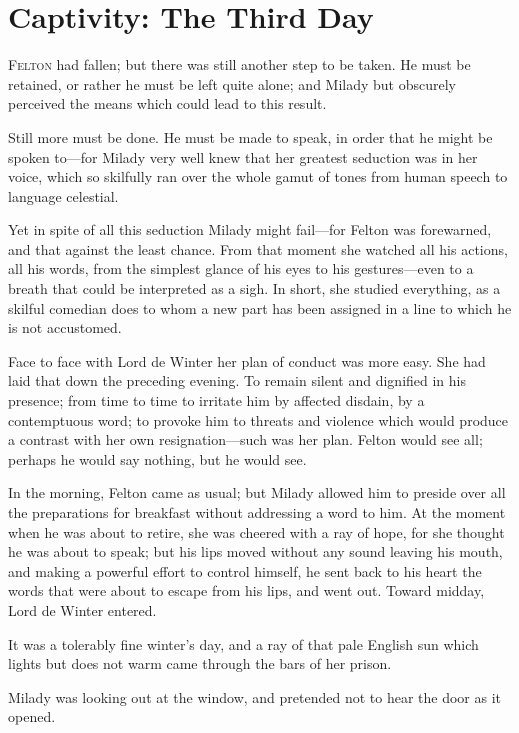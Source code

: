 
\chapter{Captivity: The Third Day}

\lettrine[]{F}{elton} had fallen; but there was still another step to be taken. He must be retained, or rather he must be left quite alone; and Milady but obscurely perceived the means which could lead to this result. 

Still more must be done. He must be made to speak, in order that he might be spoken to---for Milady very well knew that her greatest seduction was in her voice, which so skilfully ran over the whole gamut of tones from human speech to language celestial. 

Yet in spite of all this seduction Milady might fail---for Felton was forewarned, and that against the least chance. From that moment she watched all his actions, all his words, from the simplest glance of his eyes to his gestures---even to a breath that could be interpreted as a sigh. In short, she studied everything, as a skilful comedian does to whom a new part has been assigned in a line to which he is not accustomed. 

Face to face with Lord de Winter her plan of conduct was more easy. She had laid that down the preceding evening. To remain silent and dignified in his presence; from time to time to irritate him by affected disdain, by a contemptuous word; to provoke him to threats and violence which would produce a contrast with her own resignation---such was her plan. Felton would see all; perhaps he would say nothing, but he would see. 

In the morning, Felton came as usual; but Milady allowed him to preside over all the preparations for breakfast without addressing a word to him. At the moment when he was about to retire, she was cheered with a ray of hope, for she thought he was about to speak; but his lips moved without any sound leaving his mouth, and making a powerful effort to control himself, he sent back to his heart the words that were about to escape from his lips, and went out. Toward midday, Lord de Winter entered. 

It was a tolerably fine winter's day, and a ray of that pale English sun which lights but does not warm came through the bars of her prison. 

Milady was looking out at the window, and pretended not to hear the door as it opened. 

